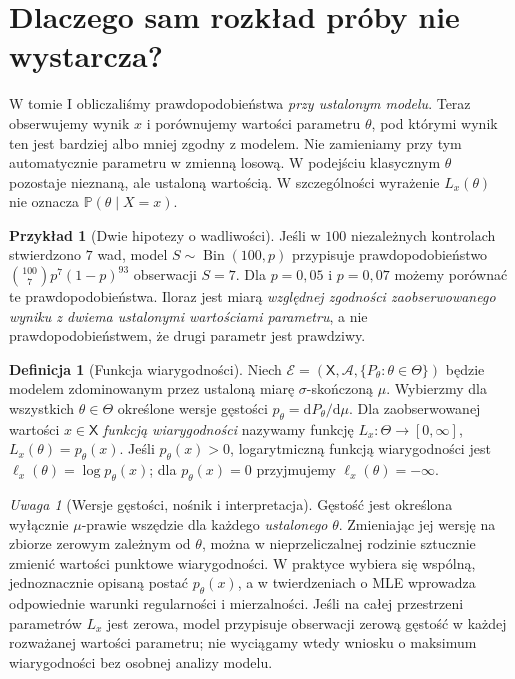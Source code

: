 \documentclass[11pt,a4paper,oneside]{report}
\numberwithin{equation}{chapter}
\theoremstyle{plain}
\theoremstyle{definition}
\newtheorem{definicja}{Definicja}[chapter]
\newtheorem{przyklad}{Przykład}[chapter]
\theoremstyle{remark}
\newtheorem{uwaga}{Uwaga}[chapter]
\newcommand{\Prob}{\mathbb P}
\newcommand{\calA}{\mathcal A}
\newcommand{\dd}{\mathrm d}
\DeclareMathOperator{\Bin}{Bin}
\begin{document}
\section{Dlaczego sam rozkład próby nie wystarcza?}
W tomie I obliczaliśmy prawdopodobieństwa \emph{przy ustalonym modelu}. Teraz
obserwujemy wynik $x$ i porównujemy wartości parametru $\theta$, pod którymi
wynik ten jest bardziej albo mniej zgodny z modelem. Nie zamieniamy przy tym
automatycznie parametru w zmienną losową. W podejściu klasycznym $\theta$
pozostaje nieznaną, ale ustaloną wartością. W szczególności wyrażenie
$L_x(\theta)$ nie oznacza $\Prob(\theta\mid X=x)$.

\begin{przyklad}[Dwie hipotezy o wadliwości]
Jeśli w $100$ niezależnych kontrolach stwierdzono $7$ wad, model
$S\sim\Bin(100,p)$ przypisuje prawdopodobieństwo
$\binom{100}{7}p^7(1-p)^{93}$ obserwacji $S=7$. Dla $p=0{,}05$ i $p=0{,}07$
możemy porównać te prawdopodobieństwa. Iloraz jest miarą \emph{względnej
zgodności zaobserwowanego wyniku z dwiema ustalonymi wartościami parametru},
a nie prawdopodobieństwem, że drugi parametr jest prawdziwy.
\end{przyklad}

\begin{definicja}[Funkcja wiarygodności]\label{def:likelihood}
Niech $\mathcal E=(\mathsf X,\calA,\{P_\theta:\theta\in\Theta\})$ będzie
modelem zdominowanym przez ustaloną miarę $\sigma$-skończoną $\mu$.
Wybierzmy dla wszystkich $\theta\in\Theta$ określone wersje gęstości
$p_\theta=\dd P_\theta/\dd\mu$. Dla zaobserwowanej wartości $x\in\mathsf X$
\emph{funkcją wiarygodności} nazywamy funkcję
$L_x:\Theta\to[0,\infty]$, $L_x(\theta)=p_\theta(x)$.
Jeśli $p_\theta(x)>0$, logarytmiczną funkcją wiarygodności jest
$\ell_x(\theta)=\log p_\theta(x)$; dla $p_\theta(x)=0$ przyjmujemy
$\ell_x(\theta)=-\infty$.
\end{definicja}

\begin{uwaga}[Wersje gęstości, nośnik i interpretacja]
Gęstość jest określona wyłącznie $\mu$-prawie wszędzie dla każdego
\emph{ustalonego} $\theta$. Zmieniając jej wersję na zbiorze zerowym
zależnym od $\theta$, można w nieprzeliczalnej rodzinie sztucznie zmienić
wartości punktowe wiarygodności. W praktyce wybiera się wspólną,
jednoznacznie opisaną postać $p_\theta(x)$, a w twierdzeniach o MLE
wprowadza odpowiednie warunki regularności i mierzalności.
Jeśli na całej przestrzeni parametrów $L_x$ jest zerowa, model przypisuje
obserwacji zerową gęstość w każdej rozważanej wartości parametru; nie
wyciągamy wtedy wniosku o maksimum wiarygodności bez osobnej analizy modelu.
\end{uwaga}
\end{document}
